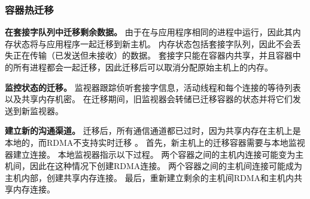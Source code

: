 
\subsubsection{容器热迁移}
\label{socksdirect:subsubsec:container_live_migration}


\textbf {在套接字队列中迁移剩余数据。}
由于\libipc {}在与应用程序相同的进程中运行，因此其内存状态将与应用程序一起迁移到新主机。
内存状态包括套接字队列，因此不会丢失正在传输（已发送但未接收）的数据。
套接字只能在容器内共享，并且容器中的所有进程都会一起迁移，因此迁移后可以取消分配原始主机上的内存。

\textbf {监控状态的迁移。}
监视器跟踪侦听套接字信息，活动线程和每个连接的等待列表以及共享内存机密。
在迁移期间，旧监视器会转储已迁移容器的状态并将它们发送到新监视器。

\textbf {建立新的沟通渠道。}
迁移后，所有通信通道都已过时，因为共享内存在主机上是本地的，而RDMA不支持实时迁移 \cite{nsdi19freeflow,slim}。
首先，新主机上的迁移容器需要与本地监视器建立连接。
本地监视器指示以下过程。
两个容器之间的主机内连接可能变为主机间，因此\libipc {}在这种情况下创建RDMA连接。
两个容器之间的主机间连接可能成为主机内部，\libipc {}创建共享内存连接。
最后，\libipc {}重新建立剩余的主机间RDMA和主机内共享内存连接。


%


